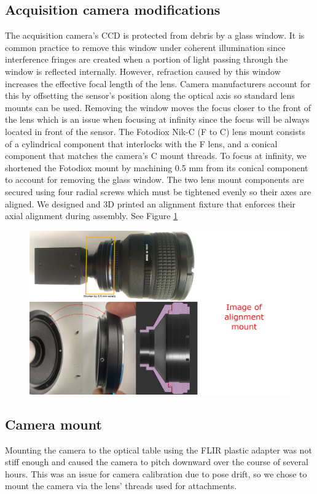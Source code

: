 \subsection{Acquisition camera modifications}
The acquisition camera's CCD is protected from debris by a glass window. It is common practice to remove this window under coherent illumination since interference fringes are created when a portion of light passing through the window is reflected internally. However, refraction caused by this window increases the effective focal length of the lens. Camera manufacturers account for this by offsetting the sensor's position along the optical axis so standard lens mounts can be used. Removing the window moves the focus closer to the front of the lens which is an issue when focusing at infinity since the focus will be always located in front of the sensor. The Fotodiox Nik-C (F to C) lens mount consists of a cylindrical component that interlocks with the F lens, and a conical component that matches the camera's C mount threads. To focus at infinity, we shortened the Fotodiox mount by machining 0.5 mm from its conical component to account for removing the glass window. The two lens mount components are secured using four radial screws which must be tightened evenly so their axes are aligned. We designed and 3D printed an alignment fixture that enforces their axial alignment during assembly. See Figure \ref{fig:fotodiox_custom}

\begin{figure}
    \centering
    \includegraphics[width=\linewidth]{figures/F-to-C_mount2.png}
    \caption{}
    \label{fig:fotodiox_custom}
\end{figure}

\subsection{Camera mount}
Mounting the camera to the optical table using the FLIR plastic adapter was not stiff enough and caused the camera to pitch downward over the course of several hours. This was an issue for camera calibration due to pose drift, so we chose to mount the camera via the lens' threads used for attachments.

